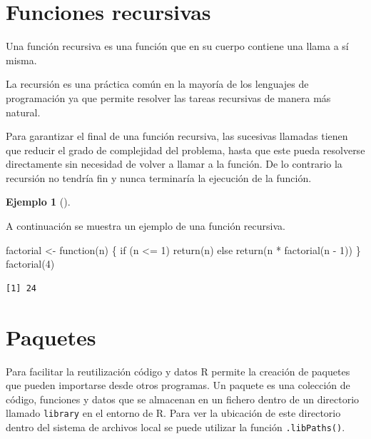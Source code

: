 \documentclass[
  a4paper,
]{scrreport}
\newenvironment{Shaded}{\begin{snugshade}}{\end{snugshade}}
\newcommand{\ControlFlowTok}[1]{\textcolor[rgb]{0.00,0.23,0.31}{#1}}
\newcommand{\DecValTok}[1]{\textcolor[rgb]{0.68,0.00,0.00}{#1}}
\newcommand{\FunctionTok}[1]{\textcolor[rgb]{0.28,0.35,0.67}{#1}}
\newcommand{\NormalTok}[1]{\textcolor[rgb]{0.00,0.23,0.31}{#1}}
\newcommand{\OtherTok}[1]{\textcolor[rgb]{0.00,0.23,0.31}{#1}}
\newcommand{\SpecialCharTok}[1]{\textcolor[rgb]{0.37,0.37,0.37}{#1}}
\theoremstyle{definition}
\newtheorem{example}{Ejemplo}[chapter]
\theoremstyle{definition}
\theoremstyle{remark}
\begin{document}
\hypertarget{funciones-recursivas}{%
\section{Funciones recursivas}\label{funciones-recursivas}}

Una función recursiva es una función que en su cuerpo contiene una llama
a sí misma.

La recursión es una práctica común en la mayoría de los lenguajes de
programación ya que permite resolver las tareas recursivas de manera más
natural.

Para garantizar el final de una función recursiva, las sucesivas
llamadas tienen que reducir el grado de complejidad del problema, hasta
que este pueda resolverse directamente sin necesidad de volver a llamar
a la función. De lo contrario la recursión no tendría fin y nunca
terminaría la ejecución de la función.

\leavevmode{}%
\begin{example}[]\label{exm-funcion-recursiva}

A continuación se muestra un ejemplo de una función recursiva.

\begin{Shaded}
\begin{Highlighting}[]
\NormalTok{factorial }\OtherTok{\textless{}{-}} \ControlFlowTok{function}\NormalTok{(n) \{}
  \ControlFlowTok{if}\NormalTok{ (n }\SpecialCharTok{\textless{}=} \DecValTok{1}\NormalTok{) }\FunctionTok{return}\NormalTok{(n)}
  \ControlFlowTok{else} \FunctionTok{return}\NormalTok{(n }\SpecialCharTok{*} \FunctionTok{factorial}\NormalTok{(n }\SpecialCharTok{{-}} \DecValTok{1}\NormalTok{))}
\NormalTok{\}}
\FunctionTok{factorial}\NormalTok{(}\DecValTok{4}\NormalTok{)}
\end{Highlighting}
\end{Shaded}

\begin{verbatim}
[1] 24
\end{verbatim}

\end{example}

\hypertarget{paquetes}{%
\section{Paquetes}\label{paquetes}}

Para facilitar la reutilización código y datos R permite la creación de
paquetes que pueden importarse desde otros programas. Un paquete es una
colección de código, funciones y datos que se almacenan en un fichero
dentro de un directorio llamado \texttt{library} en el entorno de R.
Para ver la ubicación de este directorio dentro del sistema de archivos
local se puede utilizar la función \texttt{.libPaths()}.
\end{document}
